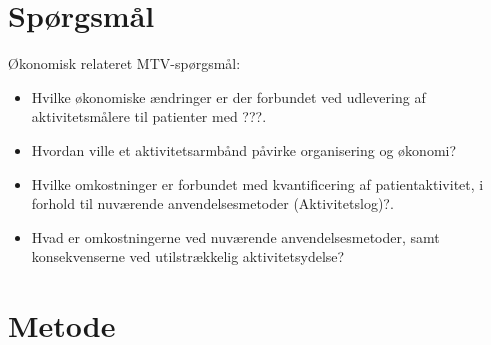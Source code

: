 
\section{Spørgsmål}



\noindent
Økonomisk relateret MTV-spørgsmål:  
\begin{itemize}
\item Hvilke økonomiske ændringer er der forbundet ved udlevering af aktivitetsmålere til patienter med ???.

\item Hvordan ville et aktivitetsarmbånd påvirke organisering og økonomi?

\item Hvilke omkostninger er forbundet med kvantificering af patientaktivitet, i forhold til nuværende anvendelsesmetoder (Aktivitetslog)?.  

\item Hvad er omkostningerne ved nuværende anvendelsesmetoder, samt konsekvenserne ved utilstrækkelig aktivitetsydelse? 
\end{itemize}

\section{Metode}

